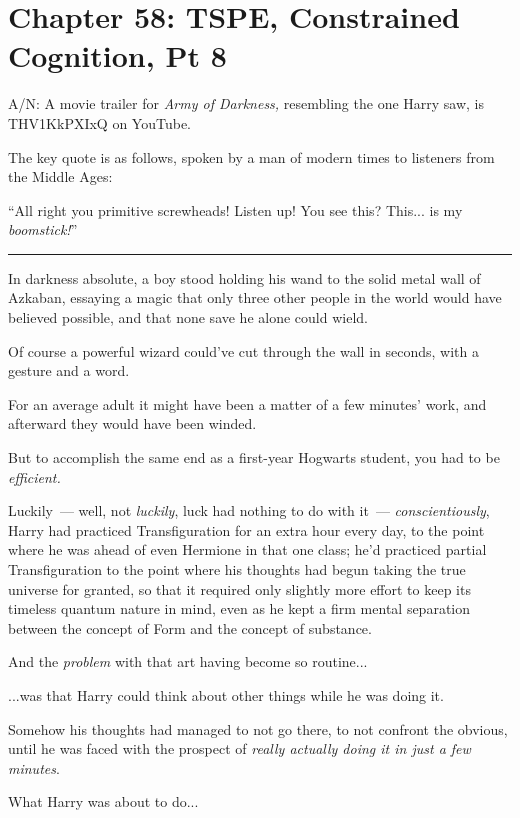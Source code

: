 \chapter{Chapter 58: TSPE, Constrained Cognition, Pt 8}
A/N: A movie trailer for \emph{Army of Darkness,} resembling the one Harry saw, is THV1KkPXIxQ on YouTube.

The key quote is as follows, spoken by a man of modern times to listeners from the Middle Ages:

``All right you primitive screwheads! Listen up! You see this? This... is my \emph{boomstick!}''

\begin{center}\rule{3in}{0.4pt}\end{center}

In darkness absolute, a boy stood holding his wand to the solid metal wall of Azkaban, essaying a magic that only three other people in the world would have believed possible, and that none save he alone could wield.

Of course a powerful wizard could've cut through the wall in seconds, with a gesture and a word.

For an average adult it might have been a matter of a few minutes' work, and afterward they would have been winded.

But to accomplish the same end as a first-year Hogwarts student, you had to be \emph{efficient.}

Luckily~--- well, not \emph{luckily}, luck had nothing to do with it~--- \emph{conscientiously}, Harry had practiced Transfiguration for an extra hour every day, to the point where he was ahead of even Hermione in that one class; he'd practiced partial Transfiguration to the point where his thoughts had begun taking the true universe for granted, so that it required only slightly more effort to keep its timeless quantum nature in mind, even as he kept a firm mental separation between the concept of Form and the concept of substance.

And the \emph{problem} with that art having become so routine...

...was that Harry could think about other things while he was doing it.

Somehow his thoughts had managed to not go there, to not confront the obvious, until he was faced with the prospect of \emph{really actually doing it in just a few minutes}.

What Harry was about to do...

